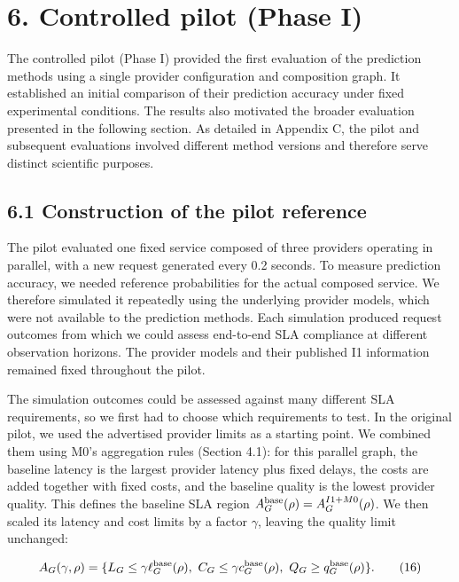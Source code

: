 \documentclass[10pt,a4paper]{article}
\begin{document}
\section*{6. Controlled pilot (Phase I)}

The controlled pilot (Phase I) provided the first evaluation of the prediction methods using a single provider configuration and composition graph. It established an initial comparison of their prediction accuracy under fixed experimental conditions. The results also motivated the broader evaluation presented in the following section. As detailed in Appendix C, the pilot and subsequent evaluations involved different method versions and therefore serve distinct scientific purposes.

\subsection*{6.1 Construction of the pilot reference}

The pilot evaluated one fixed service composed of three providers operating in parallel, with a new request generated every 0.2 seconds. To measure prediction accuracy, we needed reference probabilities for the actual composed service. We therefore simulated it repeatedly using the underlying provider models, which were not available to the prediction methods. Each simulation produced request outcomes from which we could assess end-to-end SLA compliance at different observation horizons. The provider models and their published I1 information remained fixed throughout the pilot.

The simulation outcomes could be assessed against many different SLA requirements, so we first had to choose which requirements to test. In the original pilot, we used the advertised provider limits as a starting point. We combined them using M0's aggregation rules (Section 4.1): for this parallel graph, the baseline latency is the largest provider latency plus fixed delays, the costs are added together with fixed costs, and the baseline quality is the lowest provider quality. This defines the baseline SLA region $A_G^{\rm base}(\rho)=A_G^{I1+M0}(\rho)$. We then scaled its latency and cost limits by a factor $\gamma$, leaving the quality limit unchanged:

\begin{equation*}
A_G(\gamma,\rho)
=\{L_G\le\gamma\ell_G^{\rm base}(\rho),\
C_G\le\gamma c_G^{\rm base}(\rho),\
Q_G\ge q_G^{\rm base}(\rho)\}.
\tag{16}
\end{equation*}
\end{document}
